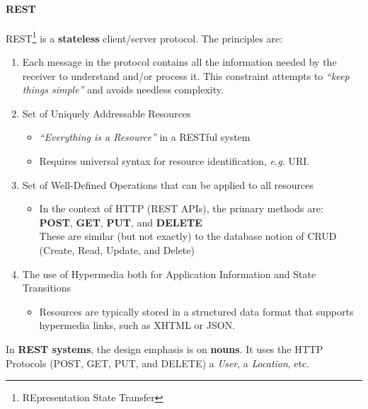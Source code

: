 \paragraph{REST}

REST\footnote{REpresentation State Transfer} is a {\bf stateless} client/server protocol. The principles are:
\begin{enumerate}
 \item Each message in the protocol contains all the information needed by the receiver to understand and/or process it. This constraint attempts to {\it ``keep things simple''} and avoids needless complexity.
 \item Set of Uniquely Addressable Resources
 \begin{itemize}
  \item {\it ``Everything is a Resource''} in a RESTful system
  \item Requires universal syntax for resource identification, {\it e.g.} URI.
 \end{itemize}
 \item Set of Well-Defined Operations that can be applied to all resources
 \begin{itemize}
  \item In the context of HTTP (REST APIs), the primary methods are: \\
  {\bf POST}, {\bf GET}, {\bf PUT}, and {\bf DELETE} \\
  These are similar (but not exactly) to the database notion of CRUD (Create, Read, Update, and Delete)
 \end{itemize}
 \item The use of Hypermedia both for Application Information and State Transitions
 \begin{itemize}
  \item Resources are typically stored in a structured data format that supports hypermedia links, such as XHTML or JSON.
 \end{itemize}
\end{enumerate}
In {\bf REST systems}, the design emphasis is on {\bf nouns}. It uses the HTTP Protocols (POST, GET, PUT, and DELETE) a {\it User}, a {\it Location}, etc. 

\clearpage




